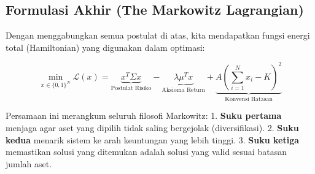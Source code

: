 \hypertarget{formulasi-akhir-the-markowitz-lagrangian}{%
\subsection{Formulasi Akhir (The Markowitz Lagrangian)}\label{formulasi-akhir-the-markowitz-lagrangian}}

Dengan menggabungkan semua postulat di atas, kita mendapatkan fungsi energi total (Hamiltonian) yang digunakan dalam optimasi:

\[ \min_{x \in \{0,1\}^N} \mathcal{L}(x) = \underbrace{x^T \Sigma x}_{\text{Postulat Risiko}} - \underbrace{\lambda \mu^T x}_{\text{Aksioma Return}} + \underbrace{A \left(\sum_{i=1}^N x_i - K \right)^2}_{\text{Konvensi Batasan}} \]

Persamaan ini merangkum seluruh filosofi Markowitz: 1. \textbf{Suku pertama} menjaga agar aset yang dipilih tidak saling bergejolak (diversifikasi). 2. \textbf{Suku kedua} menarik sistem ke arah keuntungan yang lebih tinggi. 3. \textbf{Suku ketiga} memastikan solusi yang ditemukan adalah solusi yang valid sesuai batasan jumlah aset.
